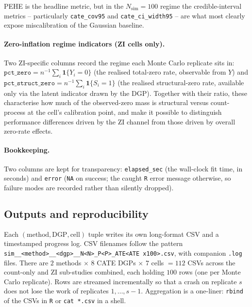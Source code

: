 \documentclass[11pt]{article}
\theoremstyle{plain}
\theoremstyle{definition}
\theoremstyle{remark}
\newcommand{\ind}{\mathbf{1}}
\begin{document}
PEHE \citep{hill2011bayesian} is the headline metric, but in the
$N_{\mathrm{sim}} = 100$ regime the credible-interval metrics --
particularly \verb|cate_cov95| and \verb|cate_ci_width95| -- are what
most clearly expose miscalibration of the Gaussian baseline.

\paragraph{Zero-inflation regime indicators (ZI cells only).}
Two ZI-specific columns record the regime each Monte Carlo replicate
sits in:
$\mathtt{pct\_zero} = n^{-1}\sum_i \ind\{Y_i = 0\}$
(the realised total-zero rate, observable from $Y$) and
$\mathtt{pct\_struct\_zero} = n^{-1}\sum_i \ind\{S_i = 1\}$
(the realised structural-zero rate, available only via the latent
indicator drawn by the DGP). Together with their ratio, these
characterise how much of the observed-zero mass is structural versus
count-process at the cell's calibration point, and make it possible
to distinguish performance differences driven by the ZI channel from
those driven by overall zero-rate effects.

\paragraph{Bookkeeping.}
Two columns are kept for transparency: \verb|elapsed_sec| (the
wall-clock fit time, in seconds) and \verb|error| (\verb|NA| on
success; the caught \verb|R| error message otherwise, so failure
modes are recorded rather than silently dropped).

\subsection{Outputs and reproducibility}\label{sec:method-outputs}

Each $(\text{method}, \text{DGP}, \text{cell})$ tuple writes its own
long-format CSV and a timestamped progress log. CSV filenames follow
the pattern
\verb|sim__<method>__<dgp>__N<N>_P<P>_ATE<ATE x100>.csv|, with
companion \verb|.log| files. There are $2$ methods $\times$ $8$ CATE
DGPs $\times$ $7$ cells $= 112$ CSVs across the count-only and ZI
sub-studies combined, each holding $100$ rows (one per Monte Carlo
replicate). Rows are streamed incrementally so that a crash on
replicate $s$ does not lose the work of replicates $1, \dots, s - 1$.
Aggregation is a one-liner: \verb|rbind| of the CSVs in \verb|R| or
\verb|cat *.csv| in a shell.
\end{document}
